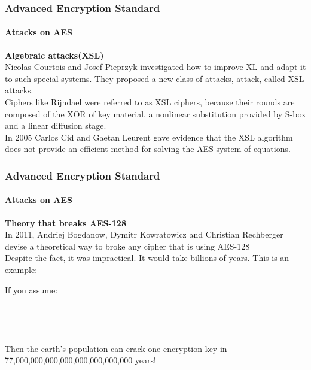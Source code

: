 \begin{frame}
	\frametitle{Advanced Encryption Standard}
		\framesubtitle{Attacks on AES}
		{\normalsize
		\textbf{Algebraic attacks(XSL)}\\
		\vspace{0.2cm}
		{Nicolas Courtois and Josef Pieprzyk investigated how to improve XL and adapt it to such special systems. They proposed a new class 		of attacks, attack, called XSL attacks.}\\ 
		\vspace{0.2cm}
		{Ciphers like Rijndael were referred to as XSL ciphers, because their rounds are composed of the XOR of key material, a nonlinear 		substitution provided by S-box and a linear diffusion stage.} \\
		\vspace{0.2cm}
		{ In 2005 Carlos Cid and Gaetan Leurent gave evidence that the XSL algorithm does not provide an efficient method for solving the AES system of equations.}\\		
		}		
\end{frame}

\begin{frame}
	\frametitle{Advanced Encryption Standard}
		\framesubtitle{Attacks on AES}
 		{\normalsize
		\textbf{Theory that breaks AES-128 }\\
		{In 2011, Andriej Bogdanow, Dymitr Kowratowicz and Christian Rechberger devise a theoretical way to broke any cipher that is using 		AES-128}\\
		{Despite the fact, it was impractical. It would take billions of years. This is an example:}\\
		}
		\begin{block}{}
		{\footnotesize
		{If you assume:}\\
		\hspace{0.5cm}{- There are 7 billions people on the planet.}\\
		\hspace{0.5cm}{- Every person on the planet owns 10 computers.}\\
		\hspace{0.5cm}{- Each of these computers can test 1 billion key combinations per second.}\\
    	\hspace{0.5cm}{- On average, you can crack the key after testing half of the possibilities.}\\
    	\vspace{0.2cm}
    	{Then the earth's population can crack one encryption key in 77,000,000,000,000,000,000,000,000 years!}\\
		}
		\end{block}
\end{frame}
	
